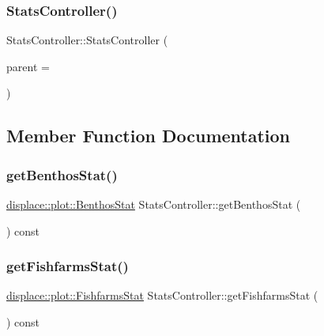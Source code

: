 \subsubsection{\texorpdfstring{StatsController()}{StatsController()}}
{\footnotesize\ttfamily Stats\+Controller\+::\+Stats\+Controller (\begin{DoxyParamCaption}\item[{Q\+Object $\ast$}]{parent = {} }\end{DoxyParamCaption})\hspace{0.3cm}{\ttfamily [explicit]}}



\subsection{Member Function Documentation}
\mbox{\label{class_stats_controller_a348979bb030615dc741f71b0fad745a9}} 
\subsubsection{\texorpdfstring{getBenthosStat()}{getBenthosStat()}}
{\footnotesize\ttfamily \mbox{\hyperlink{namespacedisplace_1_1plot_a3a91ceda6f3e5855d0e7cf97e8dea045}{displace\+::plot\+::\+Benthos\+Stat}} Stats\+Controller\+::get\+Benthos\+Stat (\begin{DoxyParamCaption}{ }\end{DoxyParamCaption}) const\hspace{0.3cm}{\ttfamily [inline]}}

\mbox{\label{class_stats_controller_a3a28bd0a3145058285384cc3e2de6d11}} 
\subsubsection{\texorpdfstring{getFishfarmsStat()}{getFishfarmsStat()}}
{\footnotesize\ttfamily \mbox{\hyperlink{namespacedisplace_1_1plot_a4746af73ffe0625cf87b8fb07fd5bfa4}{displace\+::plot\+::\+Fishfarms\+Stat}} Stats\+Controller\+::get\+Fishfarms\+Stat (\begin{DoxyParamCaption}{ }\end{DoxyParamCaption}) const\hspace{0.3cm}{\ttfamily [inline]}}

